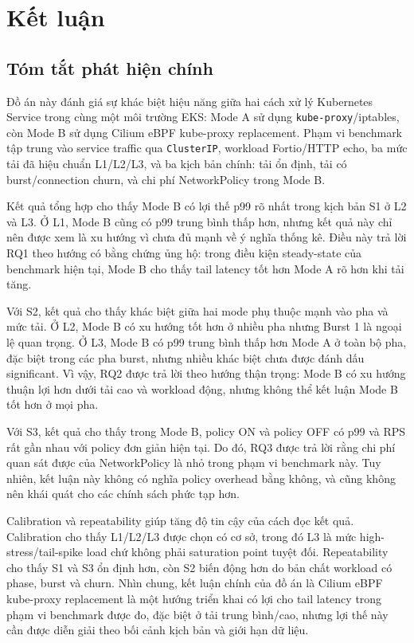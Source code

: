 
\chapter{Kết luận}

\section{Tóm tắt phát hiện chính}

Đồ án này đánh giá sự khác biệt hiệu năng giữa hai cách xử lý Kubernetes Service trong cùng một môi trường EKS: Mode A sử dụng \texttt{kube-proxy}/iptables, còn Mode B sử dụng Cilium eBPF kube-proxy replacement. Phạm vi benchmark tập trung vào service traffic qua \texttt{ClusterIP}, workload Fortio/HTTP echo, ba mức tải đã hiệu chuẩn L1/L2/L3, và ba kịch bản chính: tải ổn định, tải có burst/connection churn, và chi phí NetworkPolicy trong Mode B.

Kết quả tổng hợp cho thấy Mode B có lợi thế p99 rõ nhất trong kịch bản S1 ở L2 và L3. Ở L1, Mode B cũng có p99 trung bình thấp hơn, nhưng kết quả này chỉ nên được xem là xu hướng vì chưa đủ mạnh về ý nghĩa thống kê. Điều này trả lời RQ1 theo hướng có bằng chứng ủng hộ: trong điều kiện steady-state của benchmark hiện tại, Mode B cho thấy tail latency tốt hơn Mode A rõ hơn khi tải tăng.

Với S2, kết quả cho thấy khác biệt giữa hai mode phụ thuộc mạnh vào pha và mức tải. Ở L2, Mode B có xu hướng tốt hơn ở nhiều pha nhưng Burst 1 là ngoại lệ quan trọng. Ở L3, Mode B có p99 trung bình thấp hơn Mode A ở toàn bộ pha, đặc biệt trong các pha burst, nhưng nhiều khác biệt chưa được đánh dấu significant. Vì vậy, RQ2 được trả lời theo hướng thận trọng: Mode B có xu hướng thuận lợi hơn dưới tải cao và workload động, nhưng không thể kết luận Mode B tốt hơn ở mọi pha.

Với S3, kết quả cho thấy trong Mode B, policy ON và policy OFF có p99 và RPS rất gần nhau với policy đơn giản hiện tại. Do đó, RQ3 được trả lời rằng chi phí quan sát được của NetworkPolicy là nhỏ trong phạm vi benchmark này. Tuy nhiên, kết luận này không có nghĩa policy overhead bằng không, và cũng không nên khái quát cho các chính sách phức tạp hơn.

Calibration và repeatability giúp tăng độ tin cậy của cách đọc kết quả. Calibration cho thấy L1/L2/L3 được chọn có cơ sở, trong đó L3 là mức high-stress/tail-spike load chứ không phải saturation point tuyệt đối. Repeatability cho thấy S1 và S3 ổn định hơn, còn S2 biến động hơn do bản chất workload có phase, burst và churn. Nhìn chung, kết luận chính của đồ án là Cilium eBPF kube-proxy replacement là một hướng triển khai có lợi cho tail latency trong phạm vi benchmark được đo, đặc biệt ở tải trung bình/cao, nhưng lợi thế này cần được diễn giải theo bối cảnh kịch bản và giới hạn dữ liệu.

